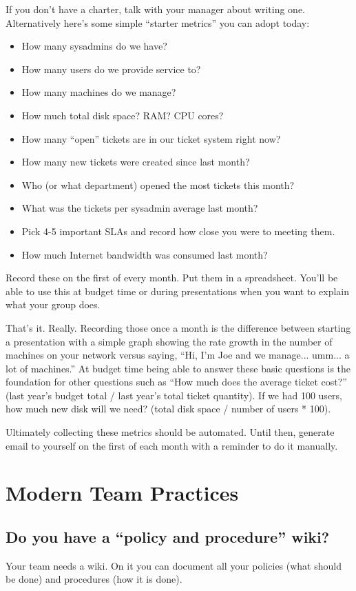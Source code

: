 \documentclass{article}
\begin{document}
If you don't have a charter, talk with your manager about writing one. Alternatively here's some simple ``starter metrics'' you can adopt today:

\begin{itemize}
    \item How many sysadmins do we have?
    \item How many users do we provide service to?
    \item How many machines do we manage?
    \item How much total disk space? RAM? CPU cores?
    \item How many ``open'' tickets are in our ticket system right now?
    \item How many new tickets were created since last month?
    \item Who (or what department) opened the most tickets this month?
    \item What was the tickets per sysadmin average last month?
    \item Pick 4-5 important SLAs and record how close you were to meeting them.
    \item How much Internet bandwidth was consumed last month?
\end{itemize}

Record these on the first of every month. Put them in a spreadsheet. You'll be able to use this at budget time or during presentations when you want to explain what your group does.

That's it. Really. Recording those once a month is the difference between starting a presentation with a simple graph showing the rate growth in the number of machines on your network versus saying, ``Hi, I'm Joe and we manage... umm... a lot of machines.'' At budget time being able to answer these basic questions is the foundation for other questions such as ``How much does the average ticket cost?'' (last year's budget total / last year's total ticket quantity). If we had 100 users, how much new disk will we need? (total disk space / number of users * 100).

Ultimately collecting these metrics should be automated. Until then, generate email to yourself on the first of each month with a reminder to do it manually.

\section{Modern Team Practices}
\subsection{Do you have a ``policy and procedure'' wiki? \Checkmark}
Your team needs a wiki. On it you can document all your policies (what should be done) and procedures (how it is done).
\end{document}
